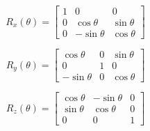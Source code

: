 \begin{equation}
	R_x(\theta)=
	\begin{bmatrix}
		1 & 0 & 0\\
		0 & \cos \theta & \sin \theta\\
		0 & -\sin \theta & \cos \theta
	\end{bmatrix}
\end{equation}

\begin{equation}
	R_y(\theta)=
	\begin{bmatrix}
		\cos \theta & 0 & \sin \theta\\
		0 & 1 & 0\\
		-\sin \theta & 0 & \cos \theta
	\end{bmatrix}
\end{equation}

\begin{equation}
	R_z(\theta)=
	\begin{bmatrix}
		\cos \theta & -\sin \theta & 0\\
		\sin \theta & \cos \theta & 0\\
		0 & 0 & 1
	\end{bmatrix}
\end{equation}
